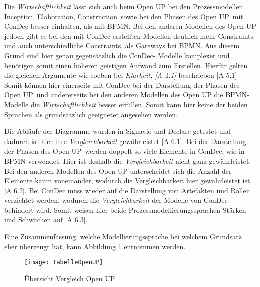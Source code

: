 Die \textit{Wirtschaftlichkeit} lässt sich auch beim Open UP bei den Prozessmodellen \grqq Inception\grqq, \grqq Elaboration\grqq, \grqq Construction\grqq \ sowie bei den \grqq Phasen des Open UP\grqq \ mit ConDec besser einhalten, als mit BPMN.  \newline
Bei den anderen Modellen des Open UP jedoch gibt es bei den mit ConDec erstellten Modellen deutlich mehr Constraints und auch unterschiedliche Constraints, als  Gateways bei BPMN. Aus diesem Grund sind hier genau gegensätzlich die ConDec- Modelle komplexer und benötigen somit einen höheren geistigen Aufwand zum Erstellen. \newline
Hierfür gelten die gleichen Argumente wie soeben bei \textit{Klarheit, [A 4.1]} beschrieben [A 5.1]
Somit können hier einerseits mit ConDec bei der Darstellung der \grqq Phasen des Open UP\grqq \ und andererseits bei den anderen Modellen des Open UP die BPMN-Modelle die \textit{Wirtschaftlichkeit} besser erfüllen. Somit kann hier keine der beiden Sprachen als grundsätzlich geeigneter angesehen werden.\newline


Die Abläufe der Diagramme wurden in Signavio und Declare getestet und dadurch ist hier ihre \textit{Vergleichbarkeit} gewährleistet [A 6.1].\newline
Bei der Darstellung der \grqq Phasen des Open UP\grqq \ werden doppelt so viele Elemente in ConDec, wie in BPMN verwendet. Hier ist deshalb die \textit{Vergleichbarkeit} nicht ganz gewährleistet. Bei den anderen Modellen des Open UP unterscheidet sich die Anzahl der Elemente kaum voneinander, wodurch die Vergleichbarkeit hier gewährleistet ist [A 6.2]. \newline
Bei ConDec muss wieder auf die Darstellung von Artefakten und Rollen verzichtet werden, wodurch die \textit{Vergleichbarkeit} der Modelle von ConDec behindert wird. Somit weisen hier beide Prozessmodellierungssprachen Stärken und Schwächen auf [A 6.3].\newline

Eine Zusammenfassung, welche Modellierungssprache bei welchem Grundsatz eher überzeugt hat, kann Abbildung \ref{fig:TabelleOpenUP} entnommen werden. \newline


\begin{figure}[htp]
\begin{center}
  \texttt{[image: TabelleOpenUP]} %
  \caption{Übersicht Vergleich Open UP}
  \label{fig:TabelleOpenUP}
\end{center}
\end{figure}


